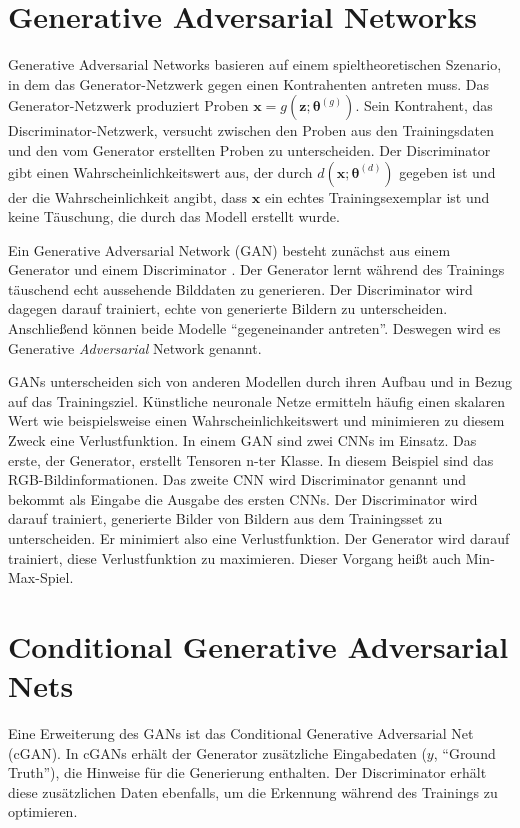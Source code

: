\section{Generative Adversarial Networks}
\label{gan}
Generative Adversarial Networks basieren auf einem spieltheoretischen Szenario, in dem das Generator-Netzwerk gegen einen Kontrahenten antreten muss. Das Generator-Netzwerk produziert Proben $\boldsymbol{x}=g(\boldsymbol{z}; \boldsymbol{\theta}^{(g)})$. Sein Kontrahent, das Discriminator-Netzwerk, versucht zwischen den Proben aus den Trainingsdaten und den vom Generator erstellten Proben zu unterscheiden. Der Discriminator gibt einen Wahrscheinlichkeitswert aus, der durch $d(\boldsymbol{x}; \boldsymbol{\theta}^{(d)})$ gegeben ist und der die Wahrscheinlichkeit angibt, dass $\boldsymbol{x}$ ein echtes Trainingsexemplar ist und keine Täuschung, die durch das Modell erstellt wurde.  \cite{goodfellow2016deeplearning}

Ein Generative Adversarial Network (GAN) besteht zunächst aus einem Generator und einem Discriminator \cite{goodfellow2014generative}. Der Generator lernt während des
Trainings täuschend echt aussehende Bilddaten zu generieren. Der Discriminator
wird dagegen darauf trainiert, echte von generierte Bildern zu unterscheiden.
Anschließend können beide Modelle ``gegeneinander antreten''. Deswegen wird es
Generative \textit{Adversarial} Network genannt.

GANs unterscheiden sich von anderen Modellen durch ihren Aufbau und in Bezug auf das Trainingsziel. Künstliche neuronale Netze ermitteln häufig einen skalaren Wert wie beispielsweise einen Wahrscheinlichkeitswert und minimieren zu diesem Zweck eine Verlustfunktion. In einem GAN sind zwei CNNs im Einsatz. Das erste, der Generator, erstellt Tensoren n-ter Klasse. In diesem Beispiel sind das RGB-Bildinformationen. Das zweite CNN wird Discriminator genannt und bekommt als Eingabe die Ausgabe des ersten CNNs. Der Discriminator wird darauf trainiert, generierte Bilder von Bildern aus dem Trainingsset zu unterscheiden. Er minimiert also eine Verlustfunktion. Der Generator wird darauf trainiert, diese Verlustfunktion zu maximieren. Dieser Vorgang heißt auch Min-Max-Spiel. \cite{goodfellow2014generative}

\section{Conditional Generative Adversarial Nets}
\label{cgan}

Eine Erweiterung des GANs ist das Conditional Generative Adversarial Net (cGAN). In cGANs erhält der Generator zusätzliche Eingabedaten ($y$, ``Ground Truth''), die Hinweise für die Generierung enthalten. Der Discriminator erhält diese zusätzlichen Daten ebenfalls, um die Erkennung während des Trainings zu optimieren.

